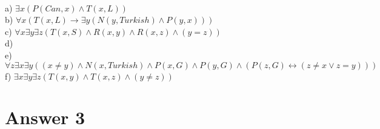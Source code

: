 \documentclass[12pt]{article}
\begin{document}
\hspace{5mm} \\
\hspace{5mm} a) $ \exists x (P(Can,x) \wedge T(x,L)) $\\
\hspace{5mm} b) $ \forall x (T(x,L) \rightarrow \exists y(N(y,Turkish) \wedge P(y,x))) $\\
\hspace{5mm} c) $ \forall x \exists y \exists z (T(x,S) \wedge R(x,y) \wedge R(x,z) \wedge (y=z))$\\
\hspace{5mm} d) \\
\hspace{5mm} e) $\forall z \exists x \exists y ((x \not=y) \wedge N(x,Turkish) \wedge P(x,G) \wedge P(y,G) \wedge (P(z,G) \leftrightarrow (z \not=x  \lor z=y )))$\\
\hspace{5mm} f) $ \exists x \exists y \exists z (T(x,y) \wedge T(x,z) \wedge (y \not=z))$\\


\section*{Answer 3}
\end{document}
